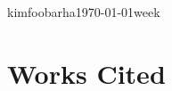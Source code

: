 \documentclass[12pt]{scrartcl}
\numberwithin{equation}{section}
\begin{document}
\newcommand{\attrib}[1]{\nopagebreak{\raggedleft\footnotesize #1\par}}
\pagestyle{empty}
\begin{mla}{kim}{foo}{bar}{ha}{\today}{week}
\newpage
\tableofcontents
\newpage
\setcounter{page}{1}
\renewcommand{\baselinestretch}{1.50}\normalsize

 \autocite[34]{portrait}
\autocite[23]{maggie} \autocite[42]{urbanspace} \autocite[23]{metropole} \autocite[87]{history}
\newpage
\nocite{*}
\section*{\bf{Works Cited}}

\printbibliography[heading=prim,keyword=prim]
\printbibliography[heading=sec,keyword=sec]
\end{mla}
\end{document}
